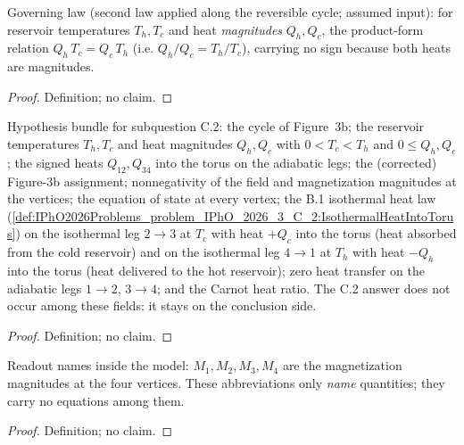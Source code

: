 \begin{definition}
\label{def:IPhO2026Problems_problem_IPhO_2026_3_C_2:CarnotHeatRatio}
Governing law (second law applied along the reversible cycle; assumed
input): for reservoir temperatures $T_h, T_c$ and heat
\emph{magnitudes} $Q_h, Q_c$, the product-form relation
$Q_h\,T_c = Q_c\,T_h$ (i.e. $Q_h/Q_c = T_h/T_c$), carrying no sign
because both heats are magnitudes.
\end{definition}
\begin{proof}
Definition; no claim.
\end{proof}

\begin{definition}
\label{def:IPhO2026Problems_problem_IPhO_2026_3_C_2:CarnotMagnetizationModel}
Hypothesis bundle for subquestion C.2: the cycle of Figure~3b; the
reservoir temperatures $T_h, T_c$ and heat magnitudes $Q_h, Q_c$ with
$0 < T_c < T_h$ and $0 \le Q_h, Q_c$; the signed heats $Q_{12}, Q_{34}$
into the torus on the adiabatic legs; the (corrected) Figure-3b
assignment; nonnegativity of the field and magnetization magnitudes at
the vertices; the equation of state at every vertex; the B.1
isothermal heat law
(\cref{def:IPhO2026Problems_problem_IPhO_2026_3_C_2:IsothermalHeatIntoTorus})
on the isothermal leg $2 \to 3$ at $T_c$ with heat $+Q_c$ into the
torus (heat absorbed from the cold reservoir) and on the isothermal
leg $4 \to 1$ at $T_h$ with heat $-Q_h$ into the torus (heat delivered
to the hot reservoir); zero heat transfer on the adiabatic legs
$1\to2$, $3\to4$; and the Carnot heat ratio.  The C.2 answer does not
occur among these fields: it stays on the conclusion side.
\end{definition}
\begin{proof}
Definition; no claim.
\end{proof}

\begin{definition}
\label{def:IPhO2026Problems_problem_IPhO_2026_3_C_2:M1}
Readout names inside the model: $M_1, M_2, M_3, M_4$ are the
magnetization magnitudes at the four vertices.  These abbreviations
only \emph{name} quantities; they carry no equations among them.
\end{definition}
\begin{proof}
Definition; no claim.
\end{proof}

